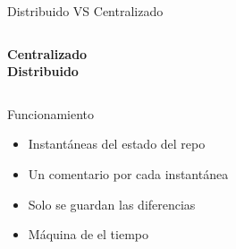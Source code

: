 \documentclass{mybeamer}
\begin{document}
\begin{framesubsec}{Distribuido VS Centralizado}
	\begin{columns}[t]
			\centering
			\textbf{\large Centralizado}
			\\[1em]
			\hspace{0.1\textwidth}
			\centering
			\textbf{\large Distribuido}
			\\[1em]
	\end{columns}
\end{framesubsec}

\begin{framesubsec}{Funcionamiento}
	\centering
	\\[2em]
	\begin{itemize}
		\item Instantáneas del estado del repo
		\item Un comentario por cada instantánea
		\item Solo se guardan las diferencias
		\item Máquina de el tiempo
	\end{itemize}
\end{framesubsec}
\end{document}
